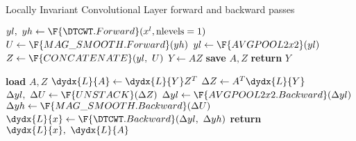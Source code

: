 \begin{algorithm}[tb]
\caption{Locally Invariant Convolutional Layer forward and backward
passes}\label{alg:ch5:inv}
\begin{algorithmic}[1]
\State $yl,\ yh \gets \F{\DTCWT.Forward}(x^l, \mbox{nlevels}=1) $ 
  \State $U \gets \F{MAG\_SMOOTH.Forward}(yh)$ 
  \State $yl \gets \F{AVGPOOL2x2}(yl)$  
  \State $Z \gets \F{CONCATENATE}(yl,\ U)$ 
  \State $Y \gets AZ$ 
  \State \textbf{save} $A, Z$ 
  \State \textbf{return} $Y$ 
\EndProcedure
\end{algorithmic}\vspace{10pt}
\begin{algorithmic}[1]
  \State \textbf{load} $A, Z$
  \State $\dydx{L}{A} \gets \dydx{L}{Y} Z^T$ 
  \State $\Delta{Z} \gets A^T\dydx{L}{Y}$ 
  \State $\Delta yl,\ \Delta U \gets \F{UNSTACK}(\Delta Z)$ 
  \State $\Delta yl \gets \F{AVGPOOL2x2.Backward}(\Delta yl)$
  \State $\Delta yh \gets \F{MAG\_SMOOTH.Backward}(\Delta U)$
  \State $\dydx{L}{x} \gets \F{\DTCWT.Backward}(\Delta yl,\ \Delta yh)$ 
  \State \textbf{return} $\dydx{L}{x},\ \dydx{L}{A}$
\EndProcedure
\end{algorithmic}
\end{algorithm}

